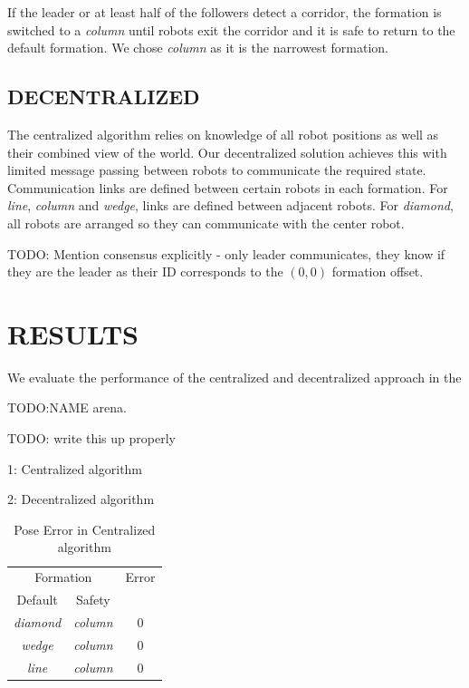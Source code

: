 \documentclass[letterpaper, 10 pt, conference]{ieeeconf}  %
\begin{document}
If the leader or at least half of the followers detect a corridor, the formation is switched to a \textit{column} until robots exit the corridor and it is safe to return to the default formation. We chose \textit{column} as it is the narrowest formation.

\subsection{DECENTRALIZED}

The centralized algorithm relies on knowledge of all robot positions as well as their combined view of the world. Our decentralized solution achieves this with limited message passing between robots to communicate the required state. Communication links are defined between certain robots in each formation. For \textit{line}, \textit{column} and \textit{wedge}, links are defined between adjacent robots. For \textit{diamond}, all robots are arranged so they can communicate with the center robot.

TODO: Mention consensus explicitly - only leader communicates, they know if they are the leader as their ID corresponds to the $(0,0)$ formation offset.

\section{RESULTS}

We evaluate the performance of the centralized and decentralized approach in the

TODO:NAME arena.

TODO: write this up properly

1: Centralized algorithm

2: Decentralized algorithm
	
\begin{table}[h]
\begin{center}
\begin{tabular}{|c c|c|}
\hline
\multicolumn{2}{|c|}{Formation} & Error \\
Default & Safety & \\
\hline
\textit{diamond}    & \textit{column} & 0 \\
\textit{wedge}       & \textit{column} & 0 \\
\textit{line}           & \textit{column} & 0 \\
\hline
\end{tabular}
\end{center}
\caption{Pose Error in Centralized algorithm}
\label{table_results_centralized}
\end{table}
\end{document}
